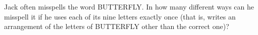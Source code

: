 Jack often misspells the word BUTTERFLY. In how many different ways can he misspell it if he uses each of its nine letters exactly once (that is, writes an arrangement of the letters of BUTTERFLY other than the correct one)?
